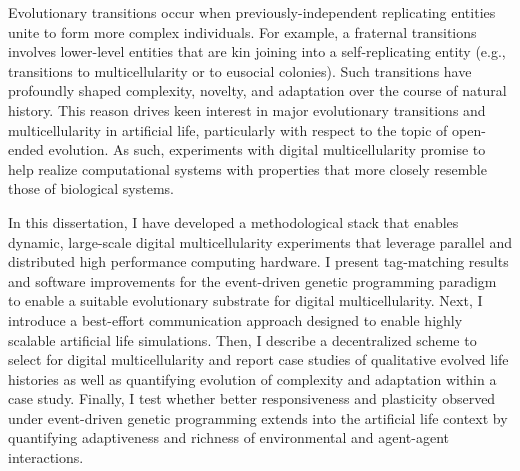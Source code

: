 Evolutionary transitions occur when previously-independent replicating entities unite to form more complex individuals.
For example, a fraternal transitions involves lower-level entities that are kin joining into a self-replicating entity (e.g., transitions to multicellularity or to eusocial colonies).
Such transitions have profoundly shaped complexity, novelty, and adaptation over the course of natural history.
This reason drives keen interest in major evolutionary transitions and multicellularity in artificial life, particularly with respect to the topic of open-ended evolution.
As such, experiments with digital multicellularity promise to help realize computational systems with properties that more closely resemble those of biological systems.

In this dissertation, I have developed a methodological stack that enables dynamic, large-scale digital multicellularity experiments that leverage parallel and distributed high performance computing hardware.
I present tag-matching results and software improvements for the event-driven genetic programming paradigm to enable a suitable evolutionary substrate for digital multicellularity.
Next, I introduce a best-effort communication approach designed to enable highly scalable artificial life simulations.
Then, I describe a decentralized scheme to select for digital multicellularity and report case studies of qualitative evolved life histories as well as quantifying evolution of complexity and adaptation within a case study.
Finally, I test whether better responsiveness and plasticity observed under event-driven genetic programming extends into the artificial life context by quantifying adaptiveness and richness of environmental and agent-agent interactions.
